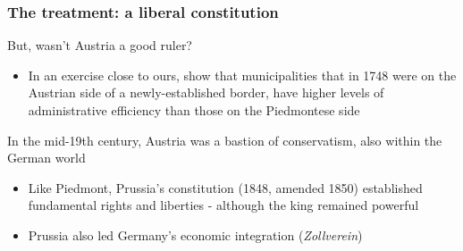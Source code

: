 \documentclass[10pt]{beamer}
\begin{document}
\begin{frame}
    \frametitle{The treatment: a liberal constitution}
    
But, wasn't Austria a good ruler?

\begin{itemize}
    \item In an exercise close to ours, \cite{cainelli2023} show that municipalities that in 1748 were on the Austrian side of a newly-established border, have higher levels of administrative efficiency than those on the Piedmontese side 
\end{itemize}

\bigskip
\pause

In the mid-19th century, Austria was a bastion of conservatism, also within the German world

\begin{itemize}
    \item Like Piedmont, Prussia's constitution (1848, amended 1850) established fundamental rights and liberties - although the king remained powerful
    \item Prussia also led Germany's economic integration (\textit{Zollverein})
\end{itemize}

\end{frame}
\end{document}
